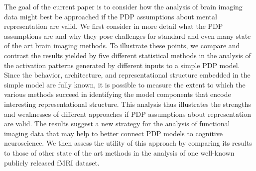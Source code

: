 The goal of the current paper is to consider how the analysis of brain imaging data might best be approached if the PDP assumptions about mental representation are valid. We first consider in more detail what the PDP assumptions are and why they pose challenges for standard and even many state of the art brain imaging methods. To illustrate these points, we compare and contrast the results yielded by five different statistical methods in the analysis of the activation patterns generated by different inputs to a simple PDP model.  Since the behavior, architecture, and representational structure embedded in the simple model are fully known, it is possible to measure the extent to which the various methods succeed in identifying the model components that encode interesting representational structure. This analysis thus illustrates the strengths and weaknesses of different approaches if PDP assumptions about representation are valid. The results suggest a new strategy for the analysis of functional imaging data that may help to better connect PDP models to cognitive neuroscience. We then assess the utility of this approach by comparing its results to those of other state of the art methods in the analysis of one well-known publicly released fMRI dataset.


